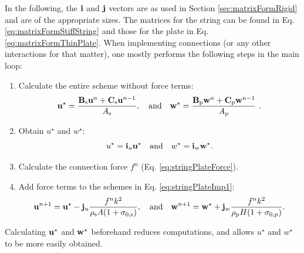 In the following, the $\mathbf{i}$ and $\mathbf{j}$ vectors are as used in Section \ref{sec:matrixFormRigid} and are of the appropriate sizes. The matrices for the string can be found in Eq. \eqref{eq:matrixFormStiffString} and those for the plate in Eq. \eqref{eq:matrixFormThinPlate}. When implementing connections (or any other interactions for that matter), one mostly performs the following steps in the main loop:
\begin{enumerate}
    \item Calculate the entire scheme without force terms:\\
    \vspace{-0.5em}\begin{equation}\label{eq:stringPlateImp1}
        \u^\star = \frac{\B_\stxt\u^n + \C_\stxt\u^{n-1}}{A_\stxt}, \qaq \w^\star = \frac{\B_\ptxt\w^n + \C_\ptxt\w^{n-1}}{A_\ptxt}\ .
    \end{equation}
    \item Obtain $u^\star$ and $w^\star$:\\
    \vspace{-1em}\begin{equation}\label{eq:stringPlateImp2}
       u^\star = \mathbf{i}_u \mathbf{u}^\star \quad \text{and} \quad w^\star = \mathbf{i}_w \mathbf{w}^\star.
    \end{equation}
    \item Calculate the connection force $f^n$ (Eq. \eqref{eq:stringPlateForce}).
    \item Add force terms to the schemes in Eq. \eqref{eq:stringPlateImp1}:\\
    \begin{equation}\label{eq:stringPlateImp4}
        \u^{n+1} = \u^{\star} - \j_u \frac{f^n k^2}{\rho_\stxt A (1+\szX[\stxt])},\qaq \w^{n+1} = \w^{\star} + \j_w \frac{f^n k^2}{\rho_\ptxt H (1+\szX[\ptxt])}.
    \end{equation} 
\end{enumerate}
Calculating $\mathbf{u}^\star$ and $\mathbf{w}^\star$ beforehand reduces computations, and allows $u^\star$ and $w^\star$ to be more easily obtained. 

